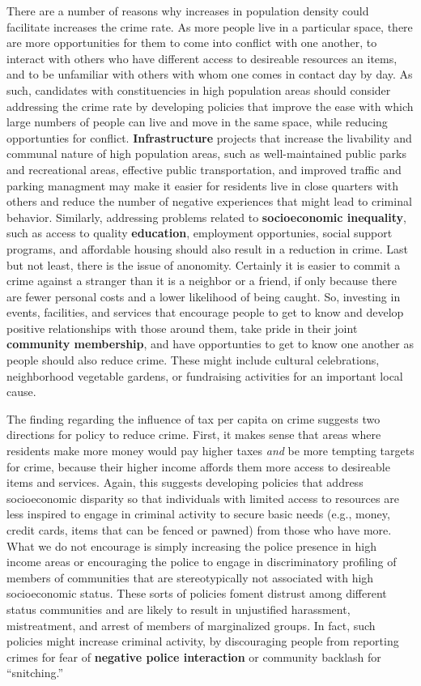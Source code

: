 \documentclass[]{article}
\begin{document}
There are a number of reasons why increases in population density could
facilitate increases the crime rate. As more people live in a particular
space, there are more opportunities for them to come into conflict with
one another, to interact with others who have different access to
desireable resources an items, and to be unfamiliar with others with
whom one comes in contact day by day. As such, candidates with
constituencies in high population areas should consider addressing the
crime rate by developing policies that improve the ease with which large
numbers of people can live and move in the same space, while reducing
opportunties for conflict. \textbf{Infrastructure} projects that
increase the livability and communal nature of high population areas,
such as well-maintained public parks and recreational areas, effective
public transportation, and improved traffic and parking managment may
make it easier for residents live in close quarters with others and
reduce the number of negative experiences that might lead to criminal
behavior. Similarly, addressing problems related to
\textbf{socioeconomic inequality}, such as access to quality
\textbf{education}, employment opportunies, social support programs, and
affordable housing should also result in a reduction in crime. Last but
not least, there is the issue of anonomity. Certainly it is easier to
commit a crime against a stranger than it is a neighbor or a friend, if
only because there are fewer personal costs and a lower likelihood of
being caught. So, investing in events, facilities, and services that
encourage people to get to know and develop positive relationships with
those around them, take pride in their joint \textbf{community
membership}, and have opportunties to get to know one another as people
should also reduce crime. These might include cultural celebrations,
neighborhood vegetable gardens, or fundraising activities for an
important local cause.

The finding regarding the influence of tax per capita on crime suggests
two directions for policy to reduce crime. First, it makes sense that
areas where residents make more money would pay higher taxes \emph{and}
be more tempting targets for crime, because their higher income affords
them more access to desireable items and services. Again, this suggests
developing policies that address socioeconomic disparity so that
individuals with limited access to resources are less inspired to engage
in criminal activity to secure basic needs (e.g., money, credit cards,
items that can be fenced or pawned) from those who have more. What we do
not encourage is simply increasing the police presence in high income
areas or encouraging the police to engage in discriminatory profiling of
members of communities that are stereotypically not associated with high
socioeconomic status. These sorts of policies foment distrust among
different status communities and are likely to result in unjustified
harassment, mistreatment, and arrest of members of marginalized groups.
In fact, such policies might increase criminal activity, by discouraging
people from reporting crimes for fear of \textbf{negative police
interaction} or community backlash for ``snitching.''
\end{document}
